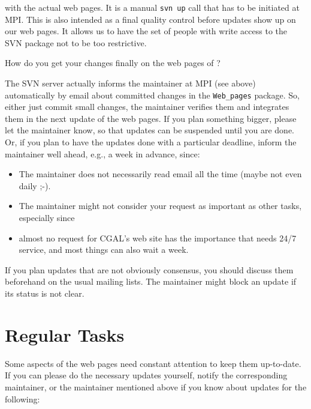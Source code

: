 with the actual web pages. It is a manual \texttt{svn up} call that
has to be initiated at MPI. This is also intended as a final quality
control before updates show up on our web pages. It allows us to have
the set of people with write access to the SVN package not to be too
restrictive.

How do you get your changes finally on the web pages of \cgal?

The SVN server actually informs the maintainer at MPI (see above)
automatically by email about committed changes in the
\texttt{Web\_pages} package. So, either just commit small changes, the
maintainer verifies them and integrates them in the next update of the
web pages. If you plan something bigger, please let the maintainer
know, so that updates can be suspended until you are done.  Or, if you
plan to have the updates done with a particular deadline, inform the
maintainer well ahead, e.g., a week in advance, since:

\begin{itemize}
    \item
        The maintainer does not necessarily read email all the time
        (maybe not even daily ;-).
    \item
        The maintainer might not consider your request as important as
        other tasks, especially since
    \item
        almost no request for CGAL's web site has the importance that needs
        24/7 service, and most things can also wait a week.
\end{itemize}

If you plan updates that are not obviously consensus, you should discuss them
beforehand on the usual mailing lists. The maintainer might block an
update if its status is not clear.


\section{Regular Tasks}

Some aspects of the web pages need constant attention to keep them
up-to-date. If you can please do the necessary updates yourself,
notify the corresponding maintainer, or the maintainer mentioned above
if you know about updates for the following:

